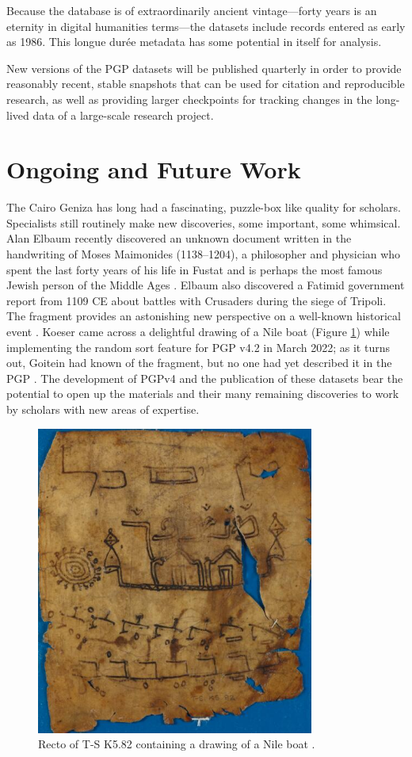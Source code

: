 \documentclass{article}
\begin{document}
Because the database is of extraordinarily ancient vintage—forty years is an eternity in digital humanities terms—the datasets include records entered as early as 1986. This longue durée metadata has some potential in itself for analysis.

New versions of the PGP datasets will be published quarterly in order to provide reasonably recent, stable snapshots that can be used for citation and reproducible research, as well as providing larger checkpoints for tracking changes in the long-lived data of a large-scale research project. 

\section{Ongoing and Future Work}

The Cairo Geniza has long had a fascinating, puzzle-box like quality for scholars. Specialists still routinely make new discoveries, some important, some whimsical. Alan Elbaum recently discovered an unknown document written in the handwriting of Moses Maimonides (1138–1204), a philosopher and physician who spent the last forty years of his life in Fustat and is perhaps the most famous Jewish person of the Middle Ages \autocite{ashur_new_2024, noauthor_list_nodate}. Elbaum also discovered a Fatimid government report from 1109 CE about battles with Crusaders during the siege of Tripoli. The fragment provides an astonishing new perspective on a well-known historical event \autocite{elbaum_franks_nodate}. Koeser came across a delightful drawing of a Nile boat (Figure \ref{fig:pgpid8483}) while implementing the random sort feature for PGP v4.2 in March 2022; as it turns out, Goitein had known of the fragment, but no one had yet described it in the PGP \autocite{noauthor_paraliterary_nodate}. The development of PGPv4 and the publication of these datasets bear the potential to open up the materials and their many remaining discoveries to work by scholars with new areas of expertise. 

\begin{figure}[!hbt]
  \includegraphics[height=4in]{MS_TS-K-5-2_detail.jpg}
  \centering
  \caption{Recto of T-S K5.82 containing a drawing of a Nile boat \autocite{noauthor_paraliterary_nodate}.}
  \label{fig:pgpid8483}
\end{figure}
\end{document}
